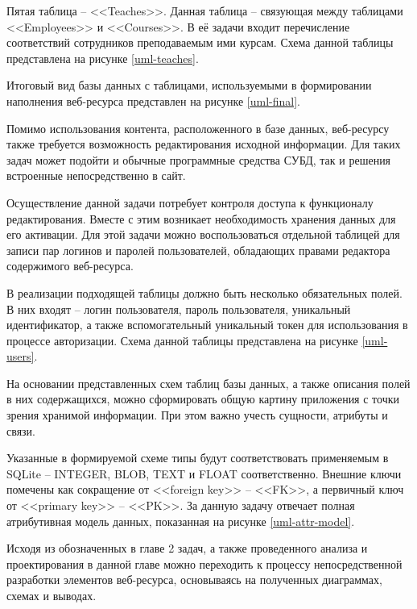 Пятая таблица -- <<Teaches>>.
Данная таблица -- связующая между таблицами <<Employees>> и <<Courses>>.
В её задачи входит перечисление соответствий сотрудников преподаваемым ими курсам.
Схема данной таблицы представлена на рисунке \ref{uml-teaches}.

Итоговый вид базы данных с таблицами, используемыми в формировании наполнения веб-ресурса представлен на рисунке \ref{uml-final}.

Помимо использования контента, расположенного в базе данных, веб-ресурсу также требуется возможность редактирования исходной информации.
Для таких задач может подойти и обычные программные средства СУБД, так и решения встроенные непосредственно в сайт.

Осуществление данной задачи потребует контроля доступа к функционалу редактирования.
Вместе с этим возникает необходимость хранения данных для его активации.
Для этой задачи можно воспользоваться отдельной таблицей для записи пар логинов и паролей пользователей, обладающих правами редактора содержимого веб-ресурса.

В реализации подходящей таблицы должно быть несколько обязательных полей.
В них входят -- логин пользователя, пароль пользователя, уникальный идентификатор, а также вспомогательный уникальный токен для использования в процессе авторизации.
Схема данной таблицы представлена на рисунке \ref{uml-users}.

На основании представленных схем таблиц базы данных, а также описания полей в них содержащихся, можно сформировать общую картину приложения с точки зрения хранимой информации.
При этом важно учесть сущности, атрибуты и связи.

Указанные в формируемой схеме типы будут соответствовать применяемым в SQLite -- INTEGER, BLOB, TEXT и FLOAT соответственно.
Внешние ключи помечены как сокращение от <<foreign key>> -- <<FK>>, а первичный ключ от <<primary key>> -- <<PK>>.
За данную задачу отвечает полная атрибутивная модель данных, показанная на рисунке \ref{uml-attr-model}.

Исходя из обозначенных в главе 2 задач, а также проведенного анализа и проектирования в данной главе можно переходить к процессу непосредственной разработки элементов веб-ресурса, основываясь на полученных диаграммах, схемах и выводах.


